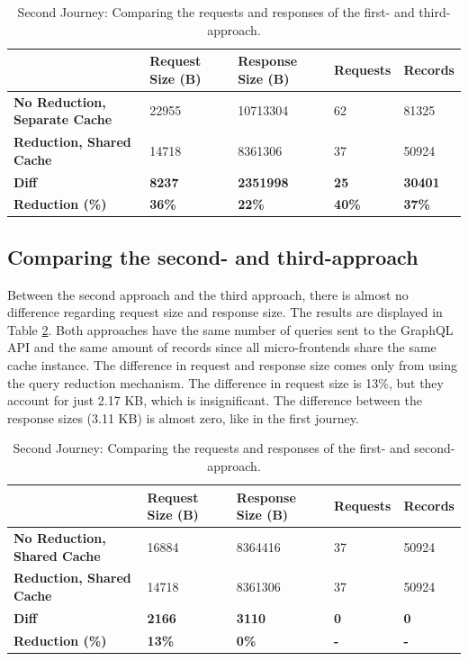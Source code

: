 \ifshowTables
\begin{table}[H]
  \begin{tabular}{|l|l|l|l|l|}
  \hline
  & \textbf{Request Size (B)} & \textbf{Response Size (B)} & \textbf{Requests} & \textbf{Records} \\
  \hline
  \textbf{No Reduction, Separate Cache} & 22955 & 10713304 & 62 & 81325 \\
  \hline
  \textbf{Reduction, Shared Cache} & 14718 & 8361306 & 37 & 50924 \\
  \hline
  \hline
  \textbf{Diff} & \textbf{8237} & \textbf{2351998} & \textbf{25} & \textbf{30401} \\
  \hline
  \textbf{Reduction (\%)} & \textbf{36\%} & \textbf{22\%} & \textbf{40\%} & \textbf{37\%} \\
  \hline
  \end{tabular}
  \caption{Second Journey: Comparing the requests and responses of the first- and third-approach.}\label{table:results:size-comparison-second-path-no-cache-no-reduction-cache-reduction}
\end{table}
\fi

\subsection{Comparing the second- and third-approach}\label{subsection:results:comparison-second-path-first-third-approach}

Between the second approach and the third approach, there is almost no difference regarding request size and response size. The results are displayed in Table \ref{table:results:size-comparison-second-path-no-cache-no-reduction-cache-no-reduction}. Both approaches have the same number of queries sent to the GraphQL \ac{API} and the same amount of records since all micro-frontends share the same cache instance. The difference in request and response size comes only from using the query reduction mechanism. The difference in request size is 13\%, but they account for just 2.17 KB, which is insignificant. The difference between the response sizes (3.11 KB) is almost zero, like in the first journey.

\ifshowTables
\begin{table}[H]
\begin{tabular}{|l|l|l|l|l|}
  \hline
  & \textbf{Request Size (B)} & \textbf{Response Size (B)} & \textbf{Requests} & \textbf{Records} \\
  \hline
  \textbf{No Reduction, Shared Cache} & 16884 & 8364416 & 37 & 50924 \\
  \hline
  \textbf{Reduction, Shared Cache} & 14718 & 8361306 & 37 & 50924 \\
  \hline
  \hline
  \textbf{Diff} & \textbf{2166} & \textbf{3110} & \textbf{0} & \textbf{0} \\
  \hline
  \textbf{Reduction (\%)} & \textbf{13\%} & \textbf{0\%} & \textbf{-} & \textbf{-} \\
  \hline
  \end{tabular}
  \caption{Second Journey: Comparing the requests and responses of the first- and second-approach.}\label{table:results:size-comparison-second-path-no-cache-no-reduction-cache-no-reduction}
\end{table}
\fi